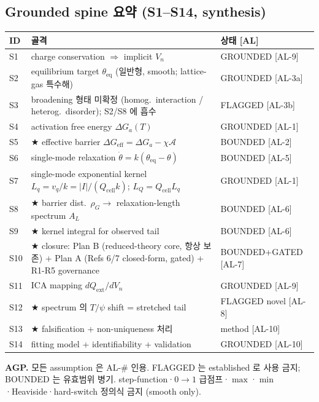 \documentclass[11pt,a4paper]{article}
\newcommand{\eff}{\mathrm{eff}}
\newcommand{\eq}{\mathrm{eq}}
\newcommand{\cell}{\mathrm{cell}}
\newcommand{\ext}{\mathrm{ext}}
\newcommand{\AL}[1]{\textsf{[AL-#1]}}
\begin{document}
\subsection{Grounded spine 요약 (S1--S14, synthesis)}\label{sec:spine}
\begin{longtable}{p{} p{} p{}}
\toprule ID & 골격 & 상태 [AL] \\ \midrule \endhead
S1 & charge conservation $\Rightarrow$ implicit $V_n$ & GROUNDED \AL{9} \\
S2 & equilibrium target $\theta_\eq$ (일반형, smooth; lattice-gas 특수해) & GROUNDED \AL{3a} \\
S3 & broadening 형태 미확정 (homog.\ interaction / heterog.\ disorder); S2/S8 에 흡수 & FLAGGED \AL{3b} \\
S4 & activation free energy $\Delta G_a(T)$ & GROUNDED \AL{1} \\
S5 & ★ effective barrier $\Delta G_\eff=\Delta G_a-\chi\mathcal A$ & BOUNDED \AL{2} \\
S6 & single-mode relaxation $\dot\theta=k(\theta_\eq-\theta)$ & BOUNDED \AL{5} \\
S7 & single-mode exponential kernel $L_q=v_q/k=|I|/(Q_\cell k)$; $L_Q=Q_\cell L_q$ & GROUNDED \AL{1} \\
S8 & ★ barrier dist.\ $\rho_G\to$ relaxation-length spectrum $A_L$ & BOUNDED \AL{6} \\
S9 & ★ kernel integral for observed tail & BOUNDED \AL{6} \\
S10 & ★ closure: Plan B (reduced-theory core, 항상 보존) + Plan A (Refs 6/7 closed-form, gated) + R1-R5 governance & BOUNDED+GATED \AL{7} \\
S11 & ICA mapping $dQ_\ext/dV_n$ & GROUNDED \AL{9} \\
S12 & ★ spectrum 의 $T/\psi$ shift = stretched tail & FLAGGED novel \AL{8} \\
S13 & ★ falsification + non-uniqueness 처리 & method \AL{10} \\
S14 & fitting model + identifiability + validation & GROUNDED \AL{10} \\
\bottomrule
\end{longtable}
\textbf{AGP.} 모든 assumption 은 AL-\# 인용. FLAGGED 는 established 로 사용 금지; BOUNDED
는 유효범위 병기. step-function·$0\!\to\!1$ 급점프·$\max$·$\min$·Heaviside·hard-switch
정의식 금지 (smooth only).
\end{document}
